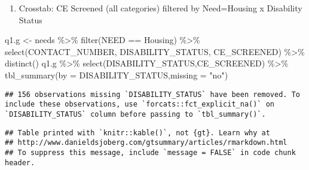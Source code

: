\documentclass[
]{article}
\newenvironment{Shaded}{\begin{snugshade}}{\end{snugshade}}
\newcommand{\AttributeTok}[1]{\textcolor[rgb]{0.77,0.63,0.00}{#1}}
\newcommand{\FunctionTok}[1]{\textcolor[rgb]{0.00,0.00,0.00}{#1}}
\newcommand{\NormalTok}[1]{#1}
\newcommand{\OtherTok}[1]{\textcolor[rgb]{0.56,0.35,0.01}{#1}}
\newcommand{\SpecialCharTok}[1]{\textcolor[rgb]{0.00,0.00,0.00}{#1}}
\newcommand{\StringTok}[1]{\textcolor[rgb]{0.31,0.60,0.02}{#1}}
\providecommand{\tightlist}{%
  \setlength{\itemsep}{0pt}\setlength{\parskip}{0pt}}
\begin{document}
\begin{enumerate}
\def\labelenumi{\alph{enumi}.}
\setcounter{enumi}{6}
\tightlist
\item
  Crosstab: CE Screened (all categories) filtered by Need=Housing x
  Disability Status
\end{enumerate}

\begin{Shaded}
\begin{Highlighting}[]
\NormalTok{q1.g }\OtherTok{\textless{}{-}}\NormalTok{ needs }\SpecialCharTok{\%\textgreater{}\%} \FunctionTok{filter}\NormalTok{(NEED }\SpecialCharTok{==} \StringTok{\textquotesingle{}Housing\textquotesingle{}}\NormalTok{) }\SpecialCharTok{\%\textgreater{}\%} \FunctionTok{select}\NormalTok{(CONTACT\_NUMBER, DISABILITY\_STATUS, CE\_SCREENED) }\SpecialCharTok{\%\textgreater{}\%} \FunctionTok{distinct}\NormalTok{()}
\NormalTok{q1.g }\SpecialCharTok{\%\textgreater{}\%} \FunctionTok{select}\NormalTok{(DISABILITY\_STATUS,CE\_SCREENED) }\SpecialCharTok{\%\textgreater{}\%} \FunctionTok{tbl\_summary}\NormalTok{(}\AttributeTok{by =}\NormalTok{ DISABILITY\_STATUS,}\AttributeTok{missing =} \StringTok{"no"}\NormalTok{)}
\end{Highlighting}
\end{Shaded}

\begin{verbatim}
## 156 observations missing `DISABILITY_STATUS` have been removed. To include these observations, use `forcats::fct_explicit_na()` on `DISABILITY_STATUS` column before passing to `tbl_summary()`.
\end{verbatim}

\begin{verbatim}
## Table printed with `knitr::kable()`, not {gt}. Learn why at
## http://www.danieldsjoberg.com/gtsummary/articles/rmarkdown.html
## To suppress this message, include `message = FALSE` in code chunk header.
\end{verbatim}
\end{document}
